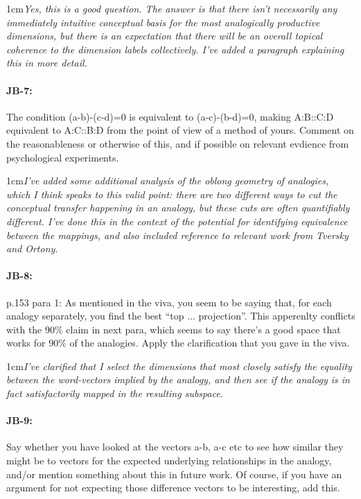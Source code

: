 \documentclass[11pt,a4paper]{article}
\newcommand{\res}[1]{\vspace{0.25cm} \begin{adjustwidth}{1cm}{}\emph{#1}\end{adjustwidth}}
\begin{document}
\res{Yes, this is a good question.  The answer is that there isn't necessarily any immediately intuitive conceptual basis for the most analogically productive dimensions, but there is an expectation that there will be an overall topical coherence to the dimension labels collectively.  I've added a paragraph explaining this in more detail.}

\paragraph{JB-7:} The condition (a-b)-(c-d)=0 is equivalent to (a-c)-(b-d)=0, making A:B::C:D equivalent to A:C::B:D from the point of view of a method of yours. Comment on the reasonableness or otherwise of this, and if possible on relevant evdience from psychological experiments.

\res{I've added some additional analysis of the oblong geometry of analogies, which I think speaks to this valid point: there are two different ways to cut the conceptual transfer happening in an analogy, but these cuts are often quantifiably different.  I've done this in the context of the potential for identifying equivalence between the mappings, and also included reference to relevant work from Tversky and Ortony.}

\paragraph{JB-8:} p.153 para 1: As mentioned in the viva, you seem to be saying that, for each analogy separately, you find the best ``top ... projection''. This apperenlty conflicts with the 90\% claim in next para, which seems to say there's a good space that works for 90\% of the analogies. Apply the clarification that you gave in the viva.

\res{I've clarified that I select the dimensions that most closely satisfy the equality between the word-vectors implied by the analogy, and then see if the analogy is in fact satisfactorily mapped in the resulting subspace.}

\paragraph{JB-9:} Say whether you have looked at the vectors a-b, a-c etc to see how similar they might be to vectors for the expected underlying relationships in the analogy, and/or mention something about this in future work. Of course, if you have an argument for not expecting those difference vectors to be interesting, add this.
\end{document}
